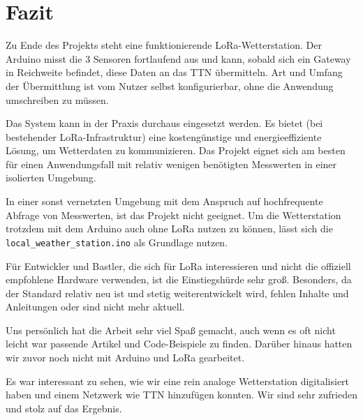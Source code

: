 \documentclass[12pt]{article}
\begin{document}
  \newpage
        
  \section{Fazit}
    Zu Ende des Projekts steht eine funktionierende LoRa-Wetterstation.
    Der Arduino misst die 3 Sensoren fortlaufend aus und kann, sobald sich ein Gateway in Reichweite befindet, diese Daten an das TTN übermitteln.
    Art und Umfang der Übermittlung ist vom Nutzer selbst konfigurierbar, ohne die Anwendung umschreiben zu müssen.
    
    Das System kann in der Praxis durchaus eingesetzt werden.
    Es bietet (bei bestehender LoRa-Infrastruktur) eine kostengünstige und energieeffiziente Lösung, um Wetterdaten zu kommunizieren.
    Das Projekt eignet sich am besten für einen Anwendungsfall mit relativ wenigen benötigten Messwerten in einer isolierten Umgebung.
    
    In einer sonst vernetzten Umgebung mit dem Anspruch auf hochfrequente Abfrage von Messwerten, ist das Projekt nicht geeignet.
    Um die Wetterstation trotzdem mit dem Arduino auch ohne LoRa nutzen zu können, lässt sich die \texttt{local\_weather\_station.ino} als Grundlage nutzen.

    Für Entwickler und Bastler, die sich für LoRa interessieren und nicht die offiziell empfohlene Hardware verwenden, ist die Einstiegshürde sehr groß.
    Besonders, da der Standard relativ neu ist und stetig weiterentwickelt wird, fehlen Inhalte und Anleitungen oder sind nicht mehr aktuell.

    Uns persönlich hat die Arbeit sehr viel Spaß gemacht, auch wenn es oft nicht leicht war passende Artikel und Code-Beispiele zu finden.
    Darüber hinaus hatten wir zuvor noch nicht mit Arduino und LoRa gearbeitet.

    Es war interessant zu sehen, wie wir eine rein analoge Wetterstation digitalisiert haben und einem Netzwerk wie TTN hinzufügen konnten.
    Wir sind sehr zufrieden und stolz auf das Ergebnis.
\end{document}
